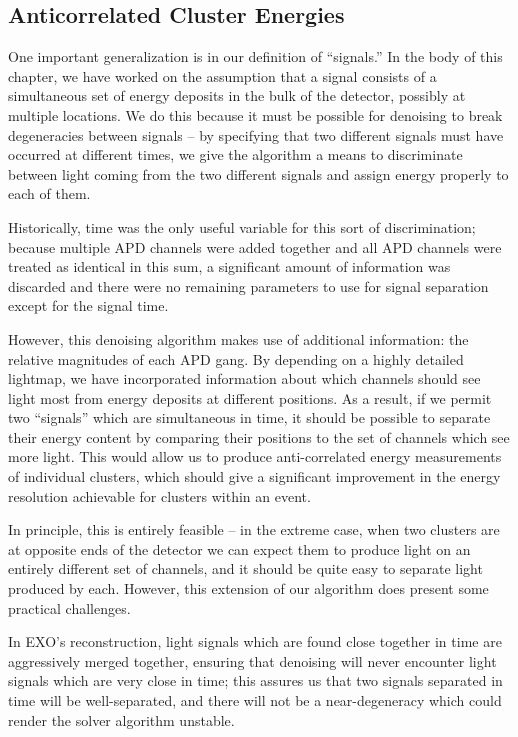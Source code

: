 \subsection{Anticorrelated Cluster Energies}

One important generalization is in our definition of ``signals.''  In the body of this chapter, we have worked on the assumption that a signal consists of a simultaneous set of energy deposits in the bulk of the detector, possibly at multiple locations.  We do this because it must be possible for denoising to break degeneracies between signals -- by specifying that two different signals must have occurred at different times, we give the algorithm a means to discriminate between light coming from the two different signals and assign energy properly to each of them.

Historically, time was the only useful variable for this sort of discrimination; because multiple APD channels were added together and all APD channels were treated as identical in this sum, a significant amount of information was discarded and there were no remaining parameters to use for signal separation except for the signal time.

However, this denoising algorithm makes use of additional information: the relative magnitudes of each APD gang.  By depending on a highly detailed lightmap, we have incorporated information about which channels should see light most from energy deposits at different positions.   As a result, if we permit two ``signals'' which are simultaneous in time, it should be possible to separate their energy content by comparing their positions to the set of channels which see more light.  This would allow us to produce anti-correlated energy measurements of individual clusters, which should give a significant improvement in the energy resolution achievable for clusters within an event.

In principle, this is entirely feasible -- in the extreme case, when two clusters are at opposite ends of the detector we can expect them to produce light on an entirely different set of channels, and it should be quite easy to separate light produced by each.  However, this extension of our algorithm does present some practical challenges.

In EXO's reconstruction, light signals which are found close together in time are aggressively merged together, ensuring that denoising will never encounter light signals which are very close in time; this assures us that two signals separated in time will be well-separated, and there will not be a near-degeneracy which could render the solver algorithm unstable.

